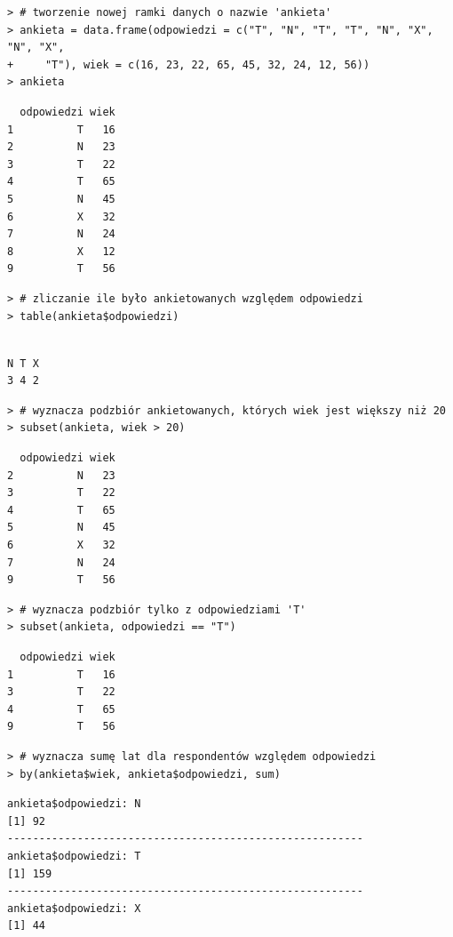 \documentclass[12pt,B5paper,]{book}
\begin{document}
\begin{verbatim}
> # tworzenie nowej ramki danych o nazwie 'ankieta'
> ankieta = data.frame(odpowiedzi = c("T", "N", "T", "T", "N", "X", "N", "X", 
+     "T"), wiek = c(16, 23, 22, 65, 45, 32, 24, 12, 56))
> ankieta
\end{verbatim}

\begin{verbatim}
  odpowiedzi wiek
1          T   16
2          N   23
3          T   22
4          T   65
5          N   45
6          X   32
7          N   24
8          X   12
9          T   56
\end{verbatim}

\begin{verbatim}
> # zliczanie ile było ankietowanych względem odpowiedzi
> table(ankieta$odpowiedzi)
\end{verbatim}

\begin{verbatim}

N T X 
3 4 2 
\end{verbatim}

\begin{verbatim}
> # wyznacza podzbiór ankietowanych, których wiek jest większy niż 20
> subset(ankieta, wiek > 20)
\end{verbatim}

\begin{verbatim}
  odpowiedzi wiek
2          N   23
3          T   22
4          T   65
5          N   45
6          X   32
7          N   24
9          T   56
\end{verbatim}

\begin{verbatim}
> # wyznacza podzbiór tylko z odpowiedziami 'T'
> subset(ankieta, odpowiedzi == "T")
\end{verbatim}

\begin{verbatim}
  odpowiedzi wiek
1          T   16
3          T   22
4          T   65
9          T   56
\end{verbatim}

\begin{verbatim}
> # wyznacza sumę lat dla respondentów względem odpowiedzi
> by(ankieta$wiek, ankieta$odpowiedzi, sum)
\end{verbatim}

\begin{verbatim}
ankieta$odpowiedzi: N
[1] 92
-------------------------------------------------------- 
ankieta$odpowiedzi: T
[1] 159
-------------------------------------------------------- 
ankieta$odpowiedzi: X
[1] 44
\end{verbatim}
\end{document}

